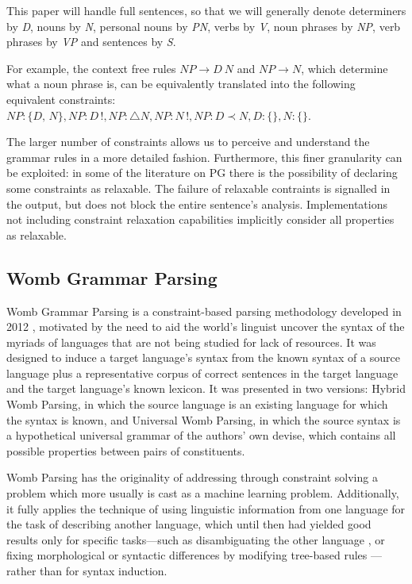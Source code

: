 \documentclass{llncs}
\newcommand{\constituency}[2]{\textit{#1} : \textit{#2}}
\newcommand{\obligation}[2]{\textit{#1} : \triangle \textit{#2}}
\newcommand{\uniqueness}[2]{\textit{#1} : \textit{#2}\,!}
\newcommand{\precedence}[3]{\textit{#1} : \textit{#2} \prec \textit{#3}}
\newcommand{\PN}{\textit{PN}\xspace}
\newcommand{\NP}{\textit{NP}\xspace}
\newcommand{\VP}{\textit{VP}\xspace}
\newcommand{\Se}{\textit{S}\xspace}
\newcommand{\N}{\textit{N}\xspace}
\newcommand{\V}{\textit{V}\xspace}
\newcommand{\D}{\textit{D}\xspace}
\begin{document}
This paper will handle full sentences, so that we will generally denote determiners by \D, nouns by \N, personal nouns by \PN, verbs by \V, noun phrases by \NP, verb phrases by \VP and sentences by \Se.

\begin{example} For example, the context free rules $\NP\to D\ N$ and $\NP \to N$, which determine what a noun phrase is, can be equivalently translated into the following equivalent constraints: $\constituency{NP}{\{D, N\}}, \uniqueness{NP}{D}, \obligation{NP}{N}, \uniqueness{NP}{N}, \precedence{NP}{D}{N}, \constituency{D}{\{\}}, \constituency{N}{\{\}}$.
\end{example}

The larger number of constraints allows us to perceive and understand the grammar rules in a more detailed fashion. Furthermore, this finer granularity can be exploited: in some of the literature on PG there is the possibility of declaring some constraints as relaxable. The failure of relaxable contraints is signalled in the output, but does not block the entire sentence's analysis.  Implementations not including constraint relaxation capabilities implicitly consider all properties as relaxable.


 
%
\subsection{Womb Grammar Parsing}

%
 Womb Grammar Parsing   is a constraint-based parsing methodology developed in 2012 \cite {DM12}, motivated by the need to aid the world's linguist uncover the syntax of the myriads of languages that are not being studied for lack of resources.
It was designed to induce a target language's syntax from the known syntax of a source language plus a representative corpus of correct sentences in the target language and the target language's known lexicon.  It was presented in two versions: Hybrid Womb Parsing, in which the source language is an existing language for which the syntax is known, and Universal Womb Parsing,  in which the source syntax is a hypothetical universal grammar of the authors' own devise, which contains all possible properties between pairs of constituents.

Womb Parsing has the originality of addressing through constraint solving a problem  which more usually is cast as a machine learning problem. Additionally, it fully applies the technique of using  linguistic information from one language for the task of describing another language, which until then had  yielded good results only for specific tasks---such as disambiguating the other language \cite{BurkKlein:2008}, or fixing morphological or syntactic differences by modifying tree-based rules \cite{Nicolas:towardsefficient}---rather than for syntax induction.
\end{document}
